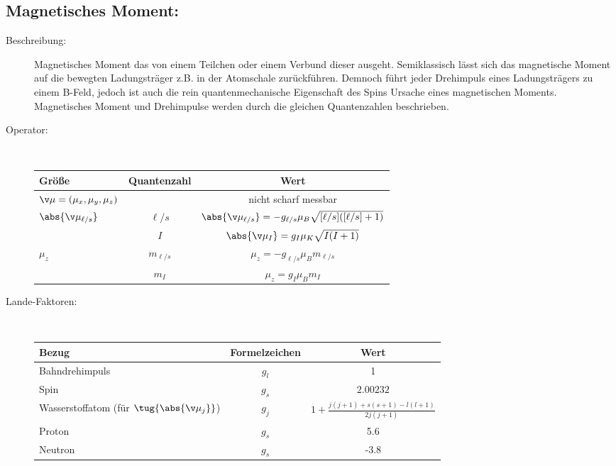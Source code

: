 \documentclass[twocolumn]{summery_4.1}
\begin{document}
\subsection{Magnetisches Moment:}
\begin{description}
    \item[Beschreibung:] Magnetisches Moment das von einem Teilchen oder einem Verbund dieser ausgeht. Semiklassisch lässt sich das magnetische Moment auf die bewegten Ladungsträger z.B. in der Atomschale zurückführen. Demnoch führt jeder Drehimpuls eines Ladungsträgers zu einem B-Feld, jedoch ist auch die rein quantenmechanische Eigenschaft des Spins Ursache eines magnetischen Moments. Magnetisches Moment und Drehimpulse werden durch die gleichen Quantenzahlen beschrieben.
    
    \item[Operator:]\,\vspace{-1ex}
    
    \begin{center}
        \begin{tabular}{@{}lcc@{}}
            \toprule 
            {\bf Größe} & {\bf Quantenzahl} & {\bf Wert}\\\midrule
            \(\v \mu= (\mu_x,\mu_y,\mu_z)\) & & nicht scharf messbar\\
            \(\abs{\v \mu_{\ell/s}}\) 
            & \(\ell/s\) & \(\abs{\v \mu_{\ell/s}} = - g_{\ell/s} \mu_B \sqrt{[{\ell/s}]([{\ell/s}]+1)}\)\\
            & \(I\) & \(\abs{\v \mu_{I}} = g_{I} \mu_K \sqrt{I(I+1)}\)\\
            \(\mu_z\) & \(m_{\ell/s}\)  & \(\mu_z = - g_{\ell/s} \mu_B m_{\ell/s}\)\\
            & \(m_{I}\)  & \(\mu_z = g_{I} \mu_B m_{I}\)\\
            \bottomrule
        \end{tabular}
    \end{center}\vspace{1ex}

    \item[Lande-Faktoren:]\,\vspace{-1ex}
    \begin{center}
        \begin{tabular}{@{}lcc@{}}
            \toprule
            {\bf Bezug} & {\bf Formelzeichen} & {\bf Wert}\\\midrule
            Bahndrehimpuls & \(g_l\) & 1\\
            Spin & \(g_s\) & \(2.00232\)\\
            Wasserstoffatom (für \(\tug{\abs{\v \mu_j}}\))& \(g_j\) & \(1 + \frac{j(j+1) + s(s+1) - l(l+1)}{2 j(j+1)} \)\\
            Proton & \(g_s\) & 5.6\\
            Neutron & \(g_s\) & -3.8\\\bottomrule
        \end{tabular}
    \end{center}
\end{description}
\end{document}
